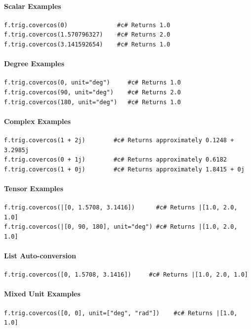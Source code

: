 \paragraph{Scalar Examples}
\begin{verbatim}
f.trig.covercos(0)              #c# Returns 1.0
f.trig.covercos(1.570796327)    #c# Returns 2.0
f.trig.covercos(3.141592654)    #c# Returns 1.0
\end{verbatim}

\paragraph{Degree Examples}
\begin{verbatim}
f.trig.covercos(0, unit="deg")     #c# Returns 1.0
f.trig.covercos(90, unit="deg")    #c# Returns 2.0
f.trig.covercos(180, unit="deg")   #c# Returns 1.0
\end{verbatim}

\paragraph{Complex Examples}
\begin{verbatim}
f.trig.covercos(1 + 2j)        #c# Returns approximately 0.1248 + 3.2985j
f.trig.covercos(0 + 1j)        #c# Returns approximately 0.6182
f.trig.covercos(1 + 0j)        #c# Returns approximately 1.8415 + 0j
\end{verbatim}

\paragraph{Tensor Examples}
\begin{verbatim}
f.trig.covercos(|[0, 1.5708, 3.1416])      #c# Returns |[1.0, 2.0, 1.0]
f.trig.covercos(|[0, 90, 180], unit="deg") #c# Returns |[1.0, 2.0, 1.0]
\end{verbatim}

\paragraph{List Auto-conversion}
\begin{verbatim}
f.trig.covercos([0, 1.5708, 3.1416])     #c# Returns |[1.0, 2.0, 1.0]
\end{verbatim}

\paragraph{Mixed Unit Examples}
\begin{verbatim}
f.trig.covercos([0, 0], unit=["deg", "rad"])    #c# Returns |[1.0, 1.0]
\end{verbatim}

